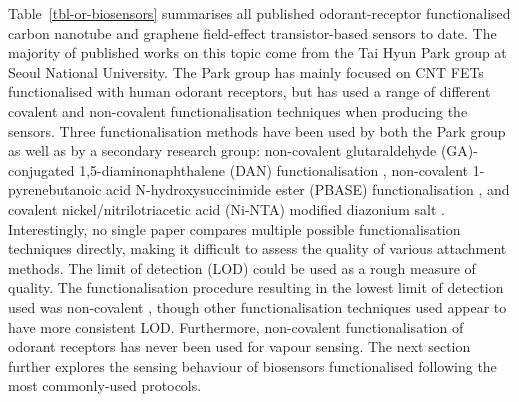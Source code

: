 \documentclass[
  a4paper,
]{scrbook}
\begin{document}
Table~\ref{tbl-or-biosensors} summarises all published odorant-receptor
functionalised carbon nanotube and graphene field-effect
transistor-based sensors to date. The majority of published works on
this topic come from the Tai Hyun Park group at Seoul National
University. The Park group has mainly focused on CNT FETs functionalised
with human odorant receptors, but has used a range of different covalent
and non-covalent functionalisation techniques when producing the
sensors. Three functionalisation methods have been used by both the Park
group as well as by a secondary research group: non-covalent
glutaraldehyde (GA)-conjugated 1,5-diaminonaphthalene (DAN)
functionalisation \autocite{Kwon2015,Goodwin2021}, non-covalent
1-pyrenebutanoic acid N-hydroxysuccinimide ester (PBASE)
functionalisation \autocite{Murugathas2020,Yoo2022}, and covalent
nickel/nitrilotriacetic acid (Ni-NTA) modified diazonium salt
\autocite{Goldsmith2011,Son2017}. Interestingly, no single paper
compares multiple possible functionalisation techniques directly, making
it difficult to assess the quality of various attachment methods. The
limit of detection (LOD) could be used as a rough measure of quality.
The functionalisation procedure resulting in the lowest limit of
detection used was non-covalent \autocite{Park2012}, though other
functionalisation techniques used appear to have more consistent LOD.
Furthermore, non-covalent functionalisation of odorant receptors has
never been used for vapour sensing. The next section further explores
the sensing behaviour of biosensors functionalised following the most
commonly-used protocols.

\newpage
{}
\end{document}
